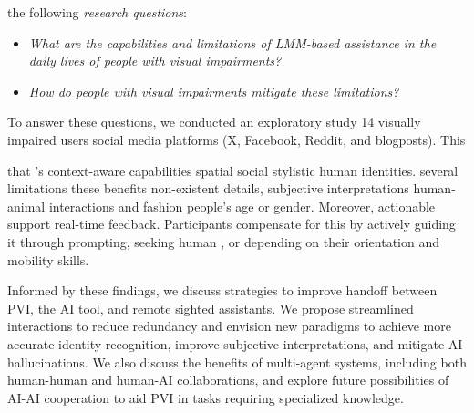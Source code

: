  the following \textit{research questions}:
\begin{itemize}
    \item \textit{What are the capabilities and limitations of LMM-based assistance in the daily lives of people with visual impairments?}
    \item \textit{How do people with visual impairments mitigate these limitations?}
\end{itemize}


To answer these questions, we conducted an exploratory study  14 visually impaired users  social media platforms (X, Facebook, Reddit, and blogposts). This  


 that \sbma's context-aware capabilities  spatial  social  stylistic  human identities.  several limitations  these benefits non-existent details,  subjective interpretations  human-animal interactions and fashion  people's age or gender.  Moreover,  actionable support real-time feedback. Participants compensate for this by actively guiding it through prompting, seeking human , or depending on their orientation and mobility skills.


Informed by these findings, we discuss strategies to improve handoff between PVI, the AI tool, and remote sighted assistants. We propose streamlined interactions to reduce redundancy and envision new paradigms to achieve more accurate identity recognition, improve subjective interpretations, and mitigate AI hallucinations. 
% 
We also discuss the benefits of multi-agent systems, including both human-human and human-AI collaborations, and explore future possibilities of AI-AI cooperation to aid PVI in tasks requiring specialized knowledge. 


